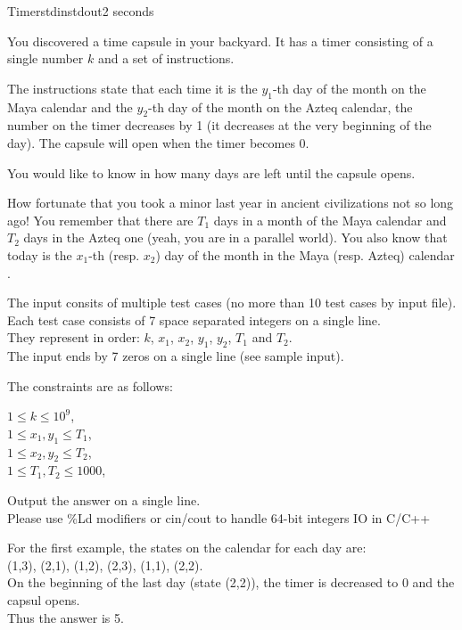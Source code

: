 \begin{problem}{Timer}{stdin}{stdout}{2 seconds}



\par You discovered a time capsule in your backyard. It has a timer consisting of a single number $k$ and a set of instructions.
\par The instructions state that each time it is the $y_1$-th day of the month on the Maya calendar and the $y_2$-th day of the month on the Azteq calendar, the number on the timer decreases by 1 (it decreases at the very beginning of the day). 
The capsule will open when the timer becomes $0$.
\par You would like to know in how many days are left until the capsule opens.

\par How fortunate that you took a minor last year in ancient civilizations not so long ago! You remember that there are $T_1$ days in a month of the Maya calendar and $T_2$ days in the Azteq one (yeah, you are in a parallel world). You also know that today is the $x_1$-th (resp. $x_2$) day of the month in the Maya (resp. Azteq) calendar .

\InputFile

The input consits of multiple test cases (no more than 10 test cases by input file).\\ 
Each test case consists of 7 space separated integers on a single line. \\ 
They represent in order: $k$, $x_1$, $x_2$, $y_1$, $y_2$, $T_1$ and $T_2$. \\ 
The input ends by 7 zeros on a single line (see sample input).\\ 

\par The constraints are as follows:

$1\le k \le 10^9$,\\ 
$1\le x_1,y_1 \le T_1$,\\ 
$1\le x_2,y_2 \le T_2$,\\ 
$1\le T_1,T_2 \le 1000$,\\ 


\OutputFile

Output the answer on a single line.\\ 
Please use \%Ld modifiers or cin/cout to handle 64-bit integers IO in C/C++

\Example

\begin{examplewide}
%
\end{examplewide}

For the first example, the states on the calendar for each day are:\\ 
(1,3), (2,1), (1,2), (2,3), (1,1), (2,2).\\
On the beginning of the last day (state (2,2)), the timer is decreased to 0 and the capsul opens.\\ 
Thus the answer is 5.

\end{problem}
